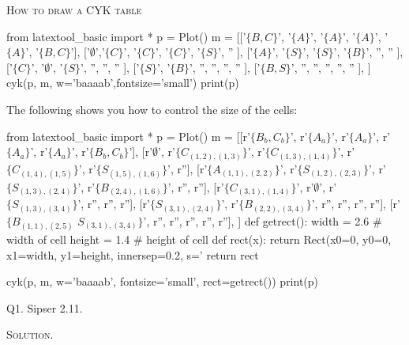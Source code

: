 \newpage

\textsc{How to draw a CYK table}

\begin{python}
from latextool_basic import *
p = Plot()
m = [['$\{B,C\}$',  '$\{A\}$',     '$\{A\}$', '$\{A\}$',  '$\{A\}$',  '$\{B,C\}$'],
     ['$\emptyset$','$\{C\}$',     '$\{C\}$', '$\{C\}$',  '$\{S\}$',  ''         ],
     ['$\{A\}$',    '$\{S\}$',     '$\{S\}$', '$\{B\}$',  '',         ''         ],
     ['$\{C\}$',    '$\emptyset$', '$\{S\}$', '',         '',         ''         ],
     ['$\{S\}$',    '$\{B\}$',     '',        '',         '',         ''         ],
     ['$\{B,S\}$',  '',            '',        '',         '',         ''         ],
     ]
cyk(p, m, w='baaaab',fontsize='small')
print(p)
\end{python}

The following shows you how to control the size of the cells:
\begin{python}
from latextool_basic import *
p = Plot()
m = [[r'$\{B_b,C_b\}$',         r'$\{A_a\}$',           r'$\{A_a\}$',           r'$\{A_a\}$',           r'$\{A_a\}$',           r'$\{B_b,C_b\}$'],
     [r'$\emptyset$',           r'$\{C_{(1,2),(1,3)}\}$', r'$\{C_{(1,3),(1,4)}\}$', r'$\{C_{(1,4),(1,5)}\}$', r'$\{S_{(1,5),(1,6)}\}$', r''],
     [r'$\{A_{(1,1),(2,2)}\}$',   r'$\{S_{(1,2),(2,3)}\}$', r'$\{S_{(1,3),(2,4)}\}$', r'$\{B_{(2,4),(1,6)}\}$', r'',                    r''],
     [r'$\{C_{(3,1),(1,4)}\}$',   r'$\emptyset$',         r'$\{S_{(1,3),(3,4)}\}$', r'',                   r'',                    r''],
     [r'$\{S_{(3,1),(2,4)}\}$',   r'$\{B_{(2,2),(3,4)}\}$', r'',                    r'',                   r'',                    r''],
     [r'$\{B_{(1,1),(2,5)}$ $S_{(3,1),(3,4)}\}$', r'',      r'',                    r'',                   r'',                    r''],
     ]
def getrect():
    width = 2.6  # width of cell
    height = 1.4 # height of cell
    def rect(x):
        return Rect(x0=0, y0=0, x1=width, y1=height,
                    innersep=0.2,
                    s='%
    return rect
    
cyk(p, m, w='baaaab', fontsize='small', rect=getrect())
print(p)
\end{python}

\newpage
Q1. Sipser 2.11. 

\textsc{Solution}.

